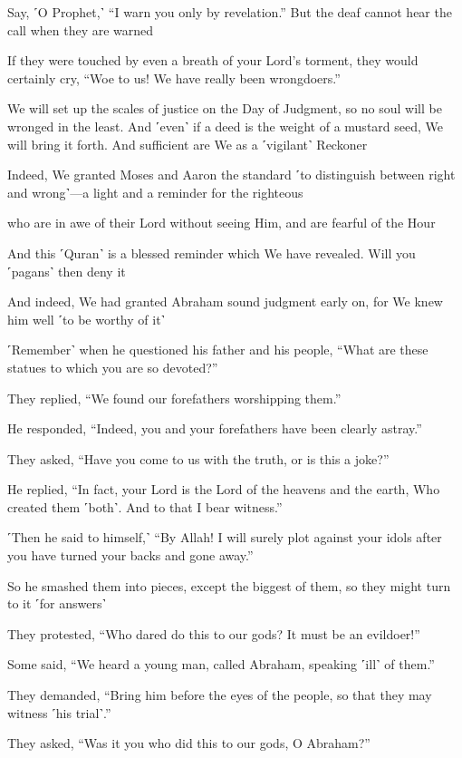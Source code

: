 Say, ˹O Prophet,˺ “I warn you only by revelation.” But the deaf cannot hear the call when they are warned

If they were touched by even a breath of your Lord’s torment, they would certainly cry, “Woe to us! We have really been wrongdoers.”

We will set up the scales of justice on the Day of Judgment, so no soul will be wronged in the least. And ˹even˺ if a deed is the weight of a mustard seed, We will bring it forth. And sufficient are We as a ˹vigilant˺ Reckoner

Indeed, We granted Moses and Aaron the standard ˹to distinguish between right and wrong˺—a light and a reminder for the righteous

who are in awe of their Lord without seeing Him, and are fearful of the Hour

And this ˹Quran˺ is a blessed reminder which We have revealed. Will you ˹pagans˺ then deny it

And indeed, We had granted Abraham sound judgment early on, for We knew him well ˹to be worthy of it˺

˹Remember˺ when he questioned his father and his people, “What are these statues to which you are so devoted?”

They replied, “We found our forefathers worshipping them.”

He responded, “Indeed, you and your forefathers have been clearly astray.”

They asked, “Have you come to us with the truth, or is this a joke?”

He replied, “In fact, your Lord is the Lord of the heavens and the earth, Who created them ˹both˺. And to that I bear witness.”

˹Then he said to himself,˺ “By Allah! I will surely plot against your idols after you have turned your backs and gone away.”

So he smashed them into pieces, except the biggest of them, so they might turn to it ˹for answers˺

They protested, “Who dared do this to our gods? It must be an evildoer!”

Some said, “We heard a young man, called Abraham, speaking ˹ill˺ of them.”

They demanded, “Bring him before the eyes of the people, so that they may witness ˹his trial˺.”

They asked, “Was it you who did this to our gods, O Abraham?”

